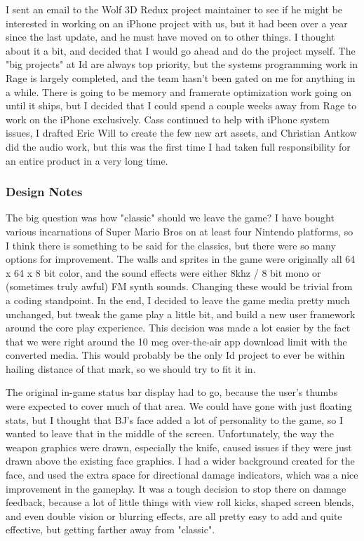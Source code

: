 \documentclass[book.tex]{subfiles}
\begin{document}
I sent an email to the Wolf 3D Redux project maintainer to see if he might be interested in working on an iPhone project with us, but it had been over a year since the last update, and he must have moved on to other things.  I thought about it a bit, and decided that I would go ahead and do the project myself.  The "big projects" at Id are always top priority, but the systems programming work in Rage is largely completed, and the team hasn't been gated on me for anything in a while.  There is going to be memory and framerate optimization  work going on until it ships, but I decided that I could spend a couple weeks away from Rage to work on the iPhone exclusively.  Cass continued to help with iPhone system issues, I drafted Eric Will to create the few new art assets, and Christian Antkow did the audio work, but this was the first time I had taken full responsibility for an entire product in a very long time.\\
\par

\subsubsection*{Design Notes}

The big question was how "classic" should we leave the game?  I have bought various incarnations of Super Mario Bros on at least four Nintendo platforms, so I think there is something to be said for the classics, but there were so many options for improvement.  The walls and sprites in the game were originally all 64 x 64 x 8 bit color, and the sound effects were either 8khz / 8 bit mono or (sometimes truly awful) FM synth sounds.  Changing these would be trivial from a coding standpoint.  In the end, I decided to leave the game media pretty much unchanged, but tweak the game play a little bit, and build a new user framework around the core play experience.  This decision was made a lot easier by the fact that we were right around the 10 meg over-the-air app download limit with the converted media.  This would probably be the only Id project to ever be within hailing distance of that mark, so we should try to fit it in.\\
\par

The original in-game status bar display had to go, because the user's thumbs were expected to cover much of that area.  We could have gone with just floating stats, but I thought that BJ's face added a lot of personality to the game, so I wanted to leave that in the middle of the screen.  Unfortunately, the way the weapon graphics were drawn, especially the knife, caused issues if they were just drawn above the existing face graphics.  I had a wider background created for the face, and used the extra space for directional damage indicators, which was a nice improvement in the gameplay.  It was a tough decision to stop there on damage feedback, because a lot of little things with view roll kicks, shaped screen blends, and even double vision or blurring effects, are all pretty easy to add and quite effective, but getting farther away from "classic".\\
\par
\end{document}
